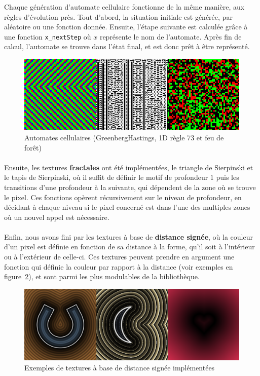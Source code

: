 \documentclass[a4paper]{article}
\begin{document}
Chaque génération d'automate cellulaire fonctionne de la même manière, aux règles d'évolution près. Tout d'abord, la situation initiale est générée, par aléatoire ou une fonction donnée. Ensuite, l'étape suivante est calculée grâce à une fonction \texttt{x\_nextStep} où $x$ représente le nom de l'automate. Après fin de calcul, l'automate se trouve dans l'état final, et est donc prêt à être représenté.

\begin{figure}
    \centering
    \includegraphics[width=0.8\columnwidth]{automates.png}
    \caption{Automates cellulaires (GreenbergHastings, 1D règle 73 et feu de forêt)}
    \label{fig:automates}
\end{figure}

\paragraph{}
Ensuite, les textures \textbf{fractales} ont été implémentées, le triangle de Sierpinski et le tapis de Sierpinski, où il suffit de définir le motif de profondeur $1$ puis les transitions d'une profondeur à la suivante, qui dépendent de la zone où se trouve le pixel. Ces fonctions opèrent récursivement sur le niveau de profondeur, en décidant à chaque niveau si le pixel concerné est dans l'une des multiples zones où un nouvel appel est nécessaire.

\paragraph{}
Enfin, nous avons fini par les textures à base de \textbf{distance signée}\cite{signedDistance}, où la couleur d'un pixel est définie en fonction de sa distance à la forme, qu'il soit à l'intérieur ou à l'extérieur de celle-ci. Ces textures peuvent prendre en argument une fonction qui définie la couleur par rapport à la distance (voir exemples en figure~\ref{fig:signed}), et sont parmi les plus modulables de la bibliothèque.

\begin{figure}
    \centering
    \includegraphics[width=0.8\columnwidth]{signed.png}
    \caption{Exemples de textures à base de distance signée implémentées}
    \label{fig:signed}
\end{figure}
\end{document}

